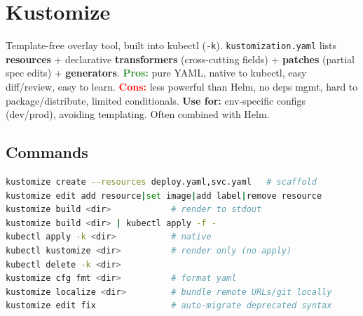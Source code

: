 \section{Kustomize}
Template-free overlay tool, built into kubectl (\texttt{-k}). \texttt{kustomization.yaml} lists \textbf{resources} + declarative \textbf{transformers} (cross-cutting fields) + \textbf{patches} (partial spec edits) + \textbf{generators}.
\textcolor{ForestGreen}{\textbf{Pros:}} pure YAML, native to kubectl, easy diff/review, easy to learn.
\textcolor{red}{\textbf{Cons:}} less powerful than Helm, no deps mgmt, hard to package/distribute, limited conditionals.
\textbf{Use for:} env-specific configs (dev/prod), avoiding templating. Often combined with Helm.

\subsection{Commands}
\begin{lstlisting}[language=sh]
kustomize create --resources deploy.yaml,svc.yaml   # scaffold
kustomize edit add resource|set image|add label|remove resource
kustomize build <dir>            # render to stdout
kustomize build <dir> | kubectl apply -f -
kubectl apply -k <dir>           # native
kubectl kustomize <dir>          # render only (no apply)
kubectl delete -k <dir>
kustomize cfg fmt <dir>          # format yaml
kustomize localize <dir>         # bundle remote URLs/git locally
kustomize edit fix               # auto-migrate deprecated syntax
\end{lstlisting}

